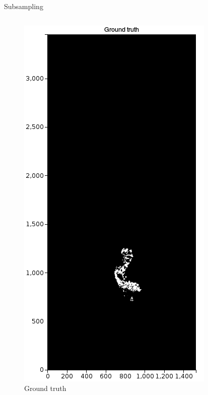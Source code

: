 \documentclass{beamer}
\begin{document}
\begin{frame}{Subsampling}
\begin{columns}[T]
\begin{column}{.25\textwidth}
\begin{figure}[!ht]
\centering
\includegraphics[width=\textwidth]{GT.png}
\caption{Ground truth}
\label{}
\end{figure}
\end{column}%
\begin{column}{.25\textwidth}

\end{column}
\end{columns}
\end{frame}
\end{document}
